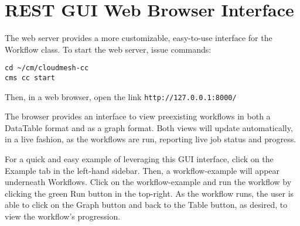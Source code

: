 \section{REST GUI Web Browser
Interface}\label{rest-gui-web-browser-interface}

The web server provides a more customizable, easy-to-use interface for
the Workflow class. To start the web server, issue commands:

\begin{verbatim}
cd ~/cm/cloudmesh-cc
cms cc start
\end{verbatim}

Then, in a web browser, open the link \verb|http://127.0.0.1:8000/|

The browser provides an interface to view preexisting workflows in both
a DataTable format and as a graph format. Both views will update
automatically, in a live fashion, as the workflows are run, reporting
live job status and progress.

For a quick and easy example of leveraging this GUI interface, click on
the Example tab in the left-hand sidebar. Then, a workflow-example will
appear underneath Workflows. Click on the workflow-example and run the
workflow by clicking the green Run button in the top-right. As the
workflow runs, the user is able to click on the Graph button and back to
the Table button, as desired, to view the workflow's progression.
